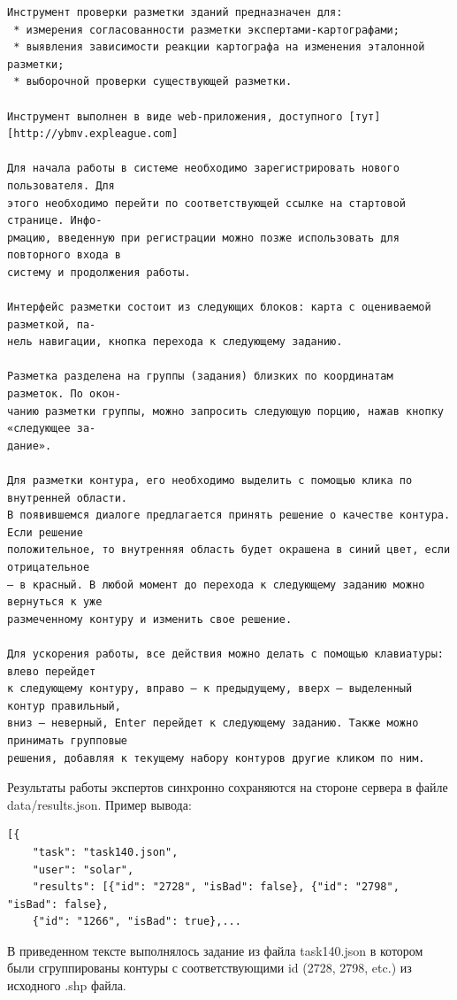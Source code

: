 \documentclass[12pt]{article}
\begin{document}
{\footnotesize\begin{verbatim}
Инструмент проверки разметки зданий предназначен для:
 * измерения согласованности разметки экспертами-картографами;
 * выявления зависимости реакции картографа на изменения эталонной разметки;
 * выборочной проверки существующей разметки.

Инструмент выполнен в виде web-приложения, доступного [тут][http://ybmv.expleague.com]

Для начала работы в системе необходимо зарегистрировать нового пользователя. Для
этого необходимо перейти по соответствующей ссылке на стартовой странице. Инфо-
рмацию, введенную при регистрации можно позже использовать для повторного входа в
систему и продолжения работы.

Интерфейс разметки состоит из следующих блоков: карта с оцениваемой разметкой, па-
нель навигации, кнопка перехода к следующему заданию.

Разметка разделена на группы (задания) близких по координатам разметок. По окон-
чанию разметки группы, можно запросить следующую порцию, нажав кнопку «следующее за-
дание».

Для разметки контура, его необходимо выделить с помощью клика по внутренней области.
В появившемся диалоге предлагается принять решение о качестве контура. Если решение
положительное, то внутренняя область будет окрашена в синий цвет, если отрицательное
— в красный. В любой момент до перехода к следующему заданию можно вернуться к уже
размеченному контуру и изменить свое решение.

Для ускорения работы, все действия можно делать с помощью клавиатуры: влево перейдет
к следующему контуру, вправо — к предыдущему, вверх — выделенный контур правильный,
вниз — неверный, Enter перейдет к следующему заданию. Также можно принимать групповые
решения, добавляя к текущему набору контуров другие кликом по ним.
\end{verbatim}}

Результаты работы экспертов синхронно сохраняются на стороне сервера в файле data/results.json. Пример вывода:
{\footnotesize
\begin{verbatim}
[{
    "task": "task140.json",
    "user": "solar",
    "results": [{"id": "2728", "isBad": false}, {"id": "2798", "isBad": false},
    {"id": "1266", "isBad": true},...
\end{verbatim}
}
В приведенном тексте выполнялось задание из файла task140.json в котором были сгруппированы контуры с соответствующими id (2728, 2798, etc.) из исходного .shp файла.
\end{document}
